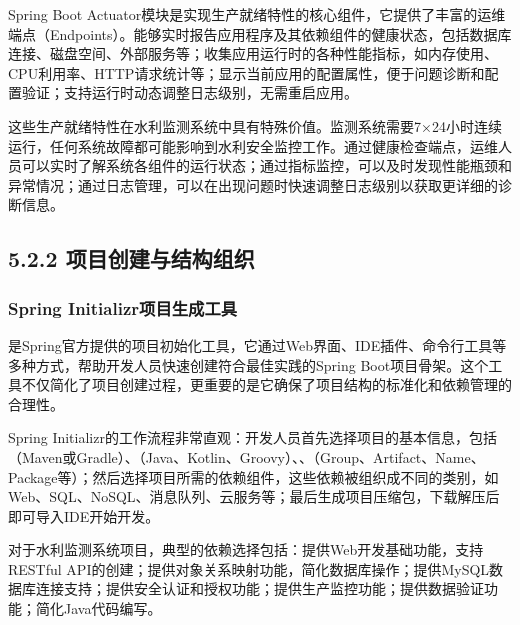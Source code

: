 Spring Boot Actuator模块是实现生产就绪特性的核心组件，它提供了丰富的运维端点（Endpoints）。能够实时报告应用程序及其依赖组件的健康状态，包括数据库连接、磁盘空间、外部服务等；收集应用运行时的各种性能指标，如内存使用、CPU利用率、HTTP请求统计等；显示当前应用的配置属性，便于问题诊断和配置验证；支持运行时动态调整日志级别，无需重启应用。

这些生产就绪特性在水利监测系统中具有特殊价值。监测系统需要7×24小时连续运行，任何系统故障都可能影响到水利安全监控工作。通过健康检查端点，运维人员可以实时了解系统各组件的运行状态；通过指标监控，可以及时发现性能瓶颈和异常情况；通过日志管理，可以在出现问题时快速调整日志级别以获取更详细的诊断信息。

\hypertarget{ux9879ux76eeux521bux5efaux4e0eux7ed3ux6784ux7ec4ux7ec7}{%
\subsection{5.2.2 项目创建与结构组织}\label{ux9879ux76eeux521bux5efaux4e0eux7ed3ux6784ux7ec4ux7ec7}}

\hypertarget{spring-initializrux9879ux76eeux751fux6210ux5de5ux5177}{%
\subsubsection{Spring Initializr项目生成工具}\label{spring-initializrux9879ux76eeux751fux6210ux5de5ux5177}}

是Spring官方提供的项目初始化工具，它通过Web界面、IDE插件、命令行工具等多种方式，帮助开发人员快速创建符合最佳实践的Spring Boot项目骨架。这个工具不仅简化了项目创建过程，更重要的是它确保了项目结构的标准化和依赖管理的合理性。

Spring Initializr的工作流程非常直观：开发人员首先选择项目的基本信息，包括（Maven或Gradle）、（Java、Kotlin、Groovy）、、（Group、Artifact、Name、Package等）；然后选择项目所需的依赖组件，这些依赖被组织成不同的类别，如Web、SQL、NoSQL、消息队列、云服务等；最后生成项目压缩包，下载解压后即可导入IDE开始开发。

对于水利监测系统项目，典型的依赖选择包括：提供Web开发基础功能，支持RESTful API的创建；提供对象关系映射功能，简化数据库操作；提供MySQL数据库连接支持；提供安全认证和授权功能；提供生产监控功能；提供数据验证功能；简化Java代码编写。

